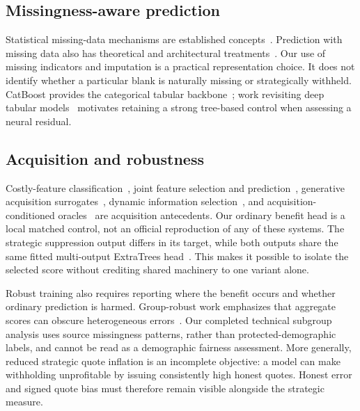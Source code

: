 \subsection{Missingness-aware prediction}
Statistical missing-data mechanisms are established
concepts~\cite{rubin1976missing}. Prediction with missing data also has
theoretical and architectural treatments~\cite{lemorvan2021imputation,
lemorvan2020neumiss}. Our use of missing indicators and imputation is a
practical representation choice. It does not identify whether a particular
blank is naturally missing or strategically withheld. CatBoost provides
the categorical tabular backbone~\cite{prokhorenkova2018catboost}; work
revisiting deep tabular models~\cite{gorishniy2021tabular} motivates
retaining a strong tree-based control when assessing a neural residual.

\subsection{Acquisition and robustness}
Costly-feature classification~\cite{janisch2019costly}, joint feature
selection and prediction~\cite{shim2018joint}, generative acquisition
surrogates~\cite{li2021gsm}, dynamic information
selection~\cite{covert2023information}, and acquisition-conditioned
oracles~\cite{valancius2024aco} are acquisition antecedents. Our ordinary
benefit head is a local matched control, not an official reproduction of
any of these systems. The strategic suppression output differs in its
target, while both outputs share the same fitted multi-output
ExtraTrees head~\cite{geurts2006extratrees}. This makes it possible to
isolate the selected score without crediting shared machinery to one
variant alone.

Robust training also requires reporting where the benefit occurs and
whether ordinary prediction is harmed. Group-robust work emphasizes
that aggregate scores can obscure heterogeneous
errors~\cite{sagawa2019groups}. Our completed technical subgroup analysis
uses source missingness patterns, rather than protected-demographic
labels, and cannot be read as a demographic fairness assessment. More
generally, reduced strategic quote inflation is an incomplete objective:
a model can make withholding unprofitable by issuing consistently high
honest quotes. Honest error and signed quote bias must therefore remain
visible alongside the strategic measure.
